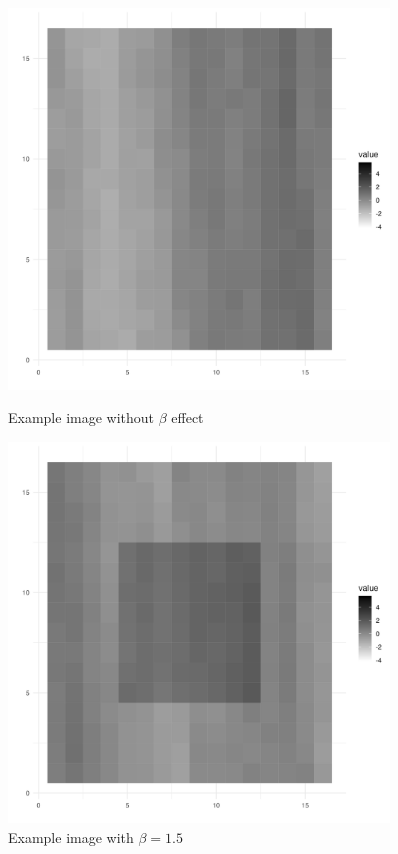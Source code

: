 \documentclass[12pt]{article}
\begin{document}
\begin{figure}[H]
    \centering
    \begin{minipage}{0.45\textwidth}
        \centering
        \includegraphics[width=0.9\textwidth]{../Figures/image_ex2c.png}
        \caption{Example image without \(\beta\) effect}
        \label{fig:image1}
    \end{minipage}\hfill
    \begin{minipage}{0.45\textwidth}
        \centering
        \includegraphics[width=0.9\textwidth]{../Figures/image_ex1_5.png}
        \caption{Example image with \(\beta = 1.5\)}
        \label{fig:image2}
    \end{minipage}


\end{figure}
\end{document}

